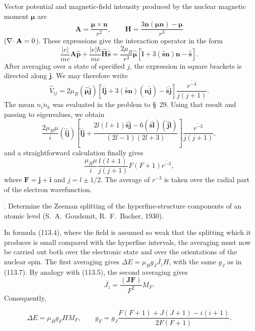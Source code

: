 \SolutionHeading Vector potential and magnetic-field intensity produced by
the nuclear magnetic moment $\boldsymbol\mu$ are
\[
 \mathbf A=\frac{\boldsymbol\mu\times\mathbf n}{r^2},\qquad
 \mathbf H=\frac{3\mathbf n(\boldsymbol\mu\mathbf n)-\boldsymbol\mu}{r^3}
\]
($\nabla\!\cdot \mathbf A=0$). These expressions give the interaction operator in the
form
\[
 \frac{|e|}{mc}\mathbf A\hat{\mathbf p}
 +\frac{|e|\hbar}{mc}\hat{\mathbf H}\hat{\mathbf s}
 =\frac{2\mu_B}{r^3}\hat{\boldsymbol\mu}
 \left[\hat{\mathbf l}+3(\hat{\mathbf s}\mathbf n)\mathbf n
 -\hat{\mathbf s}\right].
\]
After averaging over a state of specified $j$, the expression in square
brackets is directed along $\mathbf j$. We may therefore write
\[
 \hat V_{ij}=2\mu_B(\hat{\boldsymbol\mu}\hat{\mathbf j})
 [\hat{\mathbf l}\hat{\mathbf j}
 +3(\hat{\mathbf s}\mathbf n)(\mathbf n\hat{\mathbf j})
 -\hat{\mathbf s}\hat{\mathbf j}]
 \frac{\overline{r^{-3}}}{j(j+1)}.
\]
The mean $\overline{n_in_k}$ was evaluated in the problem to \S~29. Using
that result and passing to eigenvalues, we obtain
\[
 \frac{2\mu_B\mu}{i}(\hat{\mathbf i}\hat{\mathbf j})
 \left[\hat{\mathbf l}\hat{\mathbf j}
 +\frac{2l(l+1)\hat{\mathbf s}\hat{\mathbf j}
 -6(\hat{\mathbf s}\hat{\mathbf l})(\hat{\mathbf j}\hat{\mathbf l})}
 {(2l-1)(2l+3)}\right]
 \frac{\overline{r^{-3}}}{j(j+1)},
\]
and a straightforward calculation finally gives
\[
 \frac{\mu_B\mu}{i}\frac{l(l+1)}{j(j+1)}F(F+1)\overline{r^{-3}},
\]
where $\mathbf F=\mathbf j+\mathbf i$ and $j=l\pm1/2$. The average of
$r^{-3}$ is taken over the radial part of the electron wavefunction.

. Determine the Zeeman splitting of the hyperfine-structure
components of an atomic level (S.~A.~Goudsmit, R.~F.~Bacher, 1930).

\SolutionHeading In formula (113.4), where the field is assumed so weak that
the splitting which it produces is small compared with the hyperfine
intervals, the averaging must now be carried out both over the electronic
state and over the orientations of the nuclear spin. The first averaging
gives $\Delta E=\mu_Bg_J\overline{J_z}H$, with the same $g_J$ as in (113.7).
By analogy with (113.5), the second averaging gives
\[
 \overline{J_z}=\frac{(\mathbf J\mathbf F)}{F^2}M_F.
\]
Consequently,

\[
 \Delta E=\mu_Bg_FHM_F,\qquad
 g_F=g_J\frac{F(F+1)+J(J+1)-i(i+1)}{2F(F+1)}.
\]
